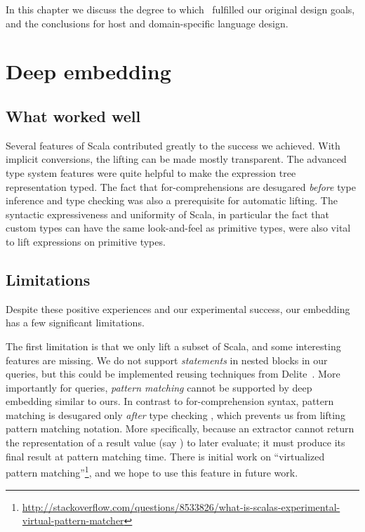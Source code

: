 In this chapter we discuss the degree to which \LoS\ fulfilled our original design goals, and the conclusions
for host and domain-specific language design.

\section{Deep embedding}
\subsection{What worked well}
Several features of Scala contributed greatly to the success we achieved. With implicit conversions, the lifting can be made mostly transparent. The advanced type system features were quite helpful to make the expression tree representation typed. The fact that for-comprehensions are desugared \emph{before} type inference and type checking was also a prerequisite for automatic lifting. The syntactic expressiveness and uniformity of Scala, in particular the fact that custom types can have the same look-and-feel as primitive types, were also vital to lift expressions on primitive types.

\subsection{Limitations}
\label{sec:limitations}
Despite these positive experiences and our experimental success, our embedding has a few significant limitations.

The first limitation is that we only lift a subset of Scala, and some interesting features are missing.
We do not support \emph{statements} in nested blocks in our queries, but this could be implemented reusing techniques from Delite~\citep{Rompf11BBlocks}.
More importantly for queries, \emph{pattern matching} cannot be supported by deep embedding similar to ours. In contrast to for-comprehension syntax, pattern matching is desugared only \emph{after} type checking \cite{Emir07Patterns}, which prevents us from lifting pattern matching notation. More specifically, because an extractor \cite{Emir07Patterns} cannot return the representation of a result value (say ) to later evaluate; it must produce its final result at pattern matching time. There is initial work on ``virtualized pattern matching''\footnote{\url{http://stackoverflow.com/questions/8533826/what-is-scalas-experimental-virtual-pattern-matcher}}, and we hope to use this feature in future work.

